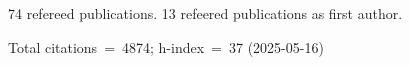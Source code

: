 74 refereed publications. 13 refeered publications as first author.

Total citations~=~4874; h-index~=~37 (2025-05-16)
